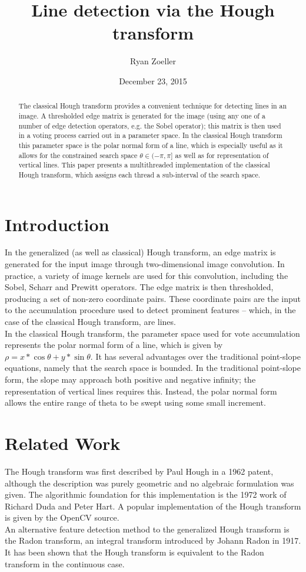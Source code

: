 \documentclass[letterpaper,12pt]{article}
\title{Line detection via the Hough transform}
\date{December 23, 2015}
\author{Ryan Zoeller}
\begin{document}

\maketitle

\begin{abstract}
The classical Hough transform provides a convenient technique for detecting lines in an image.
A thresholded edge matrix is generated for the image (using any one of a number of edge detection
operators, e.g. the Sobel operator); this matrix is then used in a voting process carried
out in a parameter space. In the classical Hough transform this parameter space is the polar
normal form of a line, which is especially useful as it allows for the constrained
search space $\theta \in (-\pi,\pi]$ as well as for representation of vertical lines.
This paper presents a multithreaded implementation of the classical Hough transform, which assigns
each thread a sub-interval of the search space.
\end{abstract}

\newpage

\section{Introduction}
In the generalized (as well as classical) Hough transform, an edge matrix is generated
for the input image through two-dimensional image convolution. In practice, a variety of image
kernels are used for this convolution, including the Sobel, Scharr and Prewitt operators.
The edge matrix is then thresholded, producing a set of non-zero coordinate pairs.
These coordinate pairs are the input to the accumulation procedure used to detect prominent
features -- which, in the case of the classical Hough transform, are lines.
\\
In the classical Hough transform, the parameter space used for vote accumulation represents
the polar normal form of a line, which is given by $\rho=x*\cos{\theta}+y*\sin{\theta}$.
It has several advantages over the traditional point-slope equations, namely that the search
space is bounded. In the traditional point-slope form, the slope may approach both positive
and negative infinity; the representation of vertical lines requires this. Instead, the
polar normal form allows the entire range of theta to be swept using some small increment.

\section{Related Work}
The Hough transform was first described by Paul Hough in a 1962 patent\cite{paulhough1962},
although the description was purely geometric and no algebraic formulation was given.
The algorithmic foundation for this implementation is the 1972 work of Richard Duda
and Peter Hart\cite{dudahart1972}. A popular implementation of the Hough transform is
given by the OpenCV source.
\\
An alternative feature detection method to the generalized Hough transform is the Radon transform,
an integral transform introduced by Johann Radon in 1917. It has been shown that the Hough transform
is equivalent to the Radon transform in the continuous case\cite{radonhough}.
\end{document}
